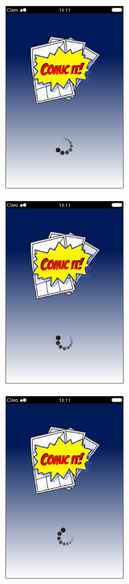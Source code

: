 \documentclass[utf8]{beamer}
\begin{document}
	\begin{frame}
		\begin{center} 
			 \includegraphics[width=0.4\textwidth]{demo4.jpg}
		\end{center}
	\end{frame}
	\begin{frame}
		\begin{center} 
			 \includegraphics[width=0.4\textwidth]{demo5.jpg}
		\end{center}
	\end{frame}
	\begin{frame}
		\begin{center} 
			 \includegraphics[width=0.4\textwidth]{demo6.jpg}
		\end{center}
	\end{frame}
\end{document}
